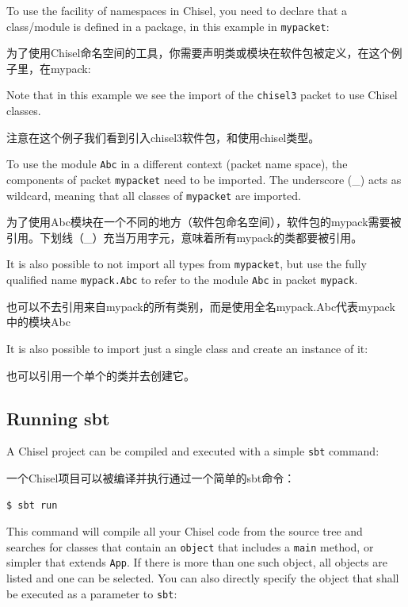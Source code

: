 \documentclass[%
    10pt,
    headinclude, footexclude,
    openright, %
    notitlepage,
    cleardoubleempty,
    headsepline,
    pointlessnumbers,
    bibtotoc, idxtotoc,
    ]{scrbook}
\newcommand{\code}[1]{{\small{\texttt{#1}}}}
\begin{document}
To use the facility of namespaces in Chisel, you need to declare that a class/module
is defined in a package, in this example in \code{mypacket}:

为了使用Chisel命名空间的工具，你需要声明类或模块在软件包被定义，在这个例子里，在mypack:


\noindent Note that in this example we see the import of the \code{chisel3} packet
to use Chisel classes.

注意在这个例子我们看到引入chisel3软件包，和使用chisel类型。

To use the module \code{Abc} in a different context (packet name space),
the components of packet \code{mypacket} need to be imported. The underscore
(\_) acts as wildcard, meaning that all classes of \code{mypacket} are imported.

为了使用Abc模块在一个不同的地方（软件包命名空间），软件包的mypack需要被引用。下划线（_）充当万用字元，意味着所有mypack的类都要被引用。



\noindent It is also possible to not import all types from \code{mypacket},
but use the fully qualified name \code{mypack.Abc} to refer to the module
\code{Abc} in packet \code{mypack}.

也可以不去引用来自mypack的所有类别，而是使用全名mypack.Abc代表mypack中的模块Abc


\noindent It is also possible to import just a single class and create an instance of it:

也可以引用一个单个的类并去创建它。



\subsection{Running sbt}

A Chisel project can be compiled and executed with a simple \code{sbt} command:

一个Chisel项目可以被编译并执行通过一个简单的sbt命令：

\begin{verbatim}
$ sbt run
\end{verbatim}

This command will compile all your Chisel code from the source tree and searches
for classes that contain an \code{object} that includes a \code{main} method, or simpler
that extends \code{App}. If there is more than one such object, all objects are listed and
one can be selected.
You can also directly specify the object that shall be executed as a parameter to \code{sbt}:
\end{document}
